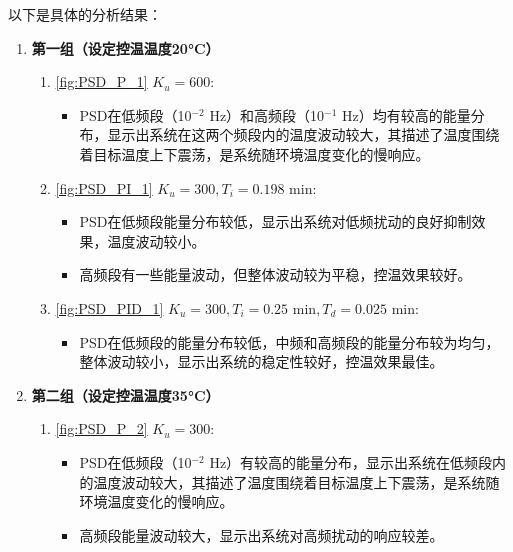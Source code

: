 \documentclass[dvipsnames, svgnames,a4paper,11pt]{article}
\begin{document}
\begin{enumerate}
            以下是具体的分析结果：
        
        \begin{enumerate}
            \item \textbf{第一组（设定控温温度20°C）}
            \begin{enumerate}
                \item \cref{fig:PSD_P_1} \( K_u = 600 \):
                \begin{itemize}
                    \item PSD在低频段（10$^{-2}$ Hz）和高频段（10$^{-1}$ Hz）均有较高的能量分布，显示出系统在这两个频段内的温度波动较大，其描述了温度围绕着目标温度上下震荡，是系统随环境温度变化的慢响应。
                \end{itemize}
                
                \item \cref{fig:PSD_PI_1} \( K_u = 300, T_i = 0.198 \text{ min} \):
                \begin{itemize}
                    \item PSD在低频段能量分布较低，显示出系统对低频扰动的良好抑制效果，温度波动较小。
                    \item 高频段有一些能量波动，但整体波动较为平稳，控温效果较好。
                \end{itemize}
                
                \item \cref{fig:PSD_PID_1} \( K_u = 300, T_i = 0.25 \text{ min}, T_d = 0.025 \text{ min} \):
                \begin{itemize}
                    \item PSD在低频段的能量分布较低，中频和高频段的能量分布较为均匀，整体波动较小，显示出系统的稳定性较好，控温效果最佳。
                \end{itemize}
            \end{enumerate}
        
            \item \textbf{第二组（设定控温温度35°C）}
            \begin{enumerate}
                \item \cref{fig:PSD_P_2} \( K_u = 300 \):
                \begin{itemize}
                    \item PSD在低频段（10$^{-2}$ Hz）有较高的能量分布，显示出系统在低频段内的温度波动较大，其描述了温度围绕着目标温度上下震荡，是系统随环境温度变化的慢响应。
                    \item 高频段能量波动较大，显示出系统对高频扰动的响应较差。
                \end{itemize}
                

\end{enumerate}
\end{enumerate}
\end{enumerate}
\end{document}
